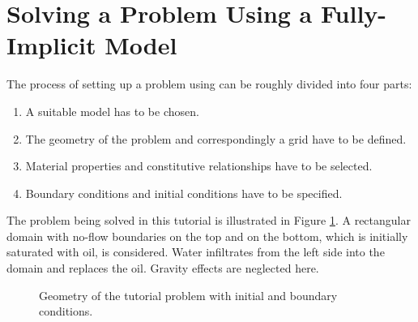 \section[Fully-Implicit Model]{Solving a Problem Using a Fully-Implicit Model}
\label{tutorial-implicit}

The process of setting up a problem using \Dumux can be roughly divided into four parts:
\begin{enumerate}
 \item A suitable model has to be chosen.
 \item The geometry of the problem and correspondingly a grid have to be defined.
 \item Material properties and constitutive relationships have to be selected.
 \item Boundary conditions and initial conditions have to be specified.
\end{enumerate}

The problem being solved in this tutorial is illustrated in Figure \ref{tutorial-implicit:problemfigure}.
A rectangular domain with no-flow boundaries on the top and on the bottom, which is initially saturated with oil, is considered.
Water infiltrates from the left side into the domain and replaces the oil. Gravity effects are neglected here.

\begin{figure}[ht]
\centering
{}
\caption{Geometry of the tutorial problem with initial and boundary conditions.}
\label{tutorial-implicit:problemfigure}
\end{figure}

